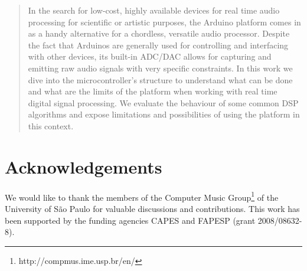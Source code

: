 \begin{abstract}


In the search for low-cost, highly available devices for real time audio
processing for scientific or artistic purposes, the Arduino platform comes in
as a handy alternative for a chordless, versatile audio processor. Despite the
fact that Arduinos are generally used for controlling and interfacing with
other devices, its built-in ADC/DAC allows for capturing and emitting raw audio
signals with very specific constraints. In this work we dive into the
microcontroller's structure to understand what can be done and what are the
limits of the platform when working with real time digital signal processing.
We evaluate the behaviour of some common DSP algorithms and expose limitations
and possibilities of using the platform in this context.


\end{abstract}






\section{Acknowledgements}

We would like to thank the members of the Computer Music
Group\footnote{http://compmus.ime.usp.br/en/} of the University of
São Paulo for valuable discussions and contributions. This work has been supported by the funding agencies CAPES and
FAPESP (grant 2008/08632-8).


%
\nocite{*}
%
%



